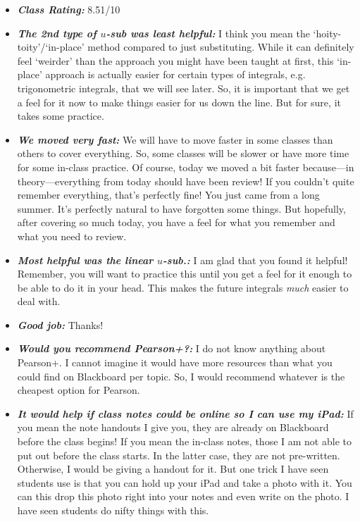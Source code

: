 \documentclass[11pt,letterpaper]{article}
\begin{document}
\begin{itemize}
\item {\bfseries\itshape Class Rating:} 8.51/10

\item {\bfseries\itshape The 2nd type of $u$-sub was least helpful:} I think you mean the `hoity-toity'/`in-place' method compared to just substituting. While it can definitely feel `weirder' than the approach you might have been taught at first, this `in-place' approach is actually easier for certain types of integrals, e.g. trigonometric integrals, that we will see later. So, it is important that we get a feel for it now to make things easier for us down the line. But for sure, it takes some practice. 

\item {\bfseries\itshape We moved very fast:} We will have to move faster in some classes than others to cover everything. So, some classes will be slower or have more time for some in-class practice. Of course, today we moved a bit faster because---in theory---everything from today should have been review! If you couldn't quite remember everything, that's perfectly fine! You just came from a long summer. It's perfectly natural to have forgotten some things. But hopefully, after covering so much today, you have a feel for what you remember and what you need to review. 

\item {\bfseries\itshape Most helpful was the linear $u$-sub.:} I am glad that you found it helpful! Remember, you will want to practice this until you get a feel for it enough to be able to do it in your head. This makes the future integrals \textit{much} easier to deal with. 

\item {\bfseries\itshape Good job:} Thanks! 

\item {\bfseries\itshape Would you recommend Pearson+?:} I do not know anything about Pearson+. I cannot imagine it would have more resources than what you could find on Blackboard per topic. So, I would recommend whatever is the cheapest option for Pearson. 

\item {\bfseries\itshape It would help if class notes could be online so I can use my iPad:} If you mean the note handouts I give you, they are already on Blackboard before the class begins! If you mean the in-class notes, those I am not able to put out before the class starts. In the latter case, they are not pre-written. Otherwise, I would be giving a handout for it. But one trick I have seen students use is that you can hold up your iPad and take a photo with it. You can this drop this photo right into your notes and even write on the photo. I have seen students do nifty things with this. 


\end{itemize}
\end{document}
